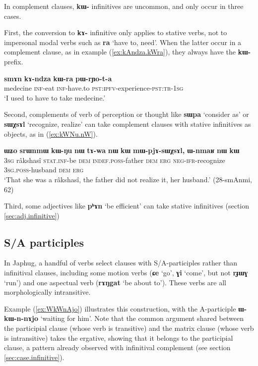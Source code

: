 \documentclass[oneside,a4paper,11pt]{article}
\newcommand{\ipa}[1]{\textbf{\phon#1}} %
\newcommand{\jpg}[2]{\ipa{#1} `#2'} %
\begin{document}
In complement clauses, \ipa{kɯ-} infinitives are uncommon, and only occur in three cases.
 
 First, the conversion to \ipa{kɤ-} infinitive only applies to stative verbs, not to  impersonal modal verbs such as \jpg{ra}{have to, need}. When the latter occur in a complement clause, as in example (\ref{ex:kAndza.kWra}), they always have the \ipa{kɯ-} prefix.

\begin{exe}
\ex \label{ex:kAndza.kWra}
\gll 
\ipa{smɤn} 	\ipa{kɤ-ndza} 	\ipa{kɯ-ra} 	\ipa{pɯ-rɲo-t-a} \\ 
medecine \textsc{inf}-eat \textsc{inf}-have.to  \textsc{pst:ipfv}-experience-\textsc{pst:tr-1sg} \\
\glt  `I used to have to take medecine.' 
\end{exe}
 
 Second, complements of verb of perception or thought like \jpg{sɯpa}{consider as} or \jpg{sɯχsɤl}{recognize, realize} can take complement clauses with stative infinitives as objects, as in (\ref{ex:kWNu.nW}).
\begin{exe}
\ex \label{ex:kWNu.nW}
\gll \ipa{ɯʑo} 	\ipa{srɯnmɯ} 	\ipa{kɯ-ŋu} 	\ipa{nɯ} 	\ipa{tɤ-wa} 	\ipa{nɯ} 	\ipa{kɯ} 	\ipa{mɯ-pjɤ-sɯχsɤl,} 	\ipa{ɯ-nmaʁ} 	\ipa{nɯ} 	\ipa{kɯ} \\
\textsc{3sg} râkshasî \textsc{stat.inf}-be \textsc{dem} \textsc{indef.poss}-father \textsc{dem} \textsc{erg} \textsc{neg-ifr}-recognize \textsc{3sg.poss}-husband \textsc{dem} \textsc{erg} \\
\glt  `That she was a râkshasî, the father did not realize it, her husband.' (28-smAnmi, 62)
\end{exe}

Third, some adjectives like \jpg{pʰɤn}{be efficient} can take stative infinitives (section \ref{sec:adj.infinitive})

 \subsection{S/A participles} \label{sec:SApart}
In Japhug, a handful of verbs select clauses with S/A-participles rather than infinitival clauses, including  some motion verbs (\jpg{ɕe}{go}, \jpg{ɣi}{come}, but not \jpg{rɟɯɣ}{run}) and one aspectual verb  (\jpg{rɤŋgat}{be about to}). These verbs are all morphologically intransitive.

Example (\ref{ex:WkWnAjo}) illustrates this construction, with the A-participle \ipa{ɯ-kɯ-n-nɤjo} `waiting for him'. Note that the common argument shared between the participial clause (whose verb is transitive) and the matrix clause (whose verb is intransitive) takes the ergative, showing that it belongs to the participial clause, a pattern already observed with infinitival complement (see section \ref{sec:case.infinitive}).
\end{document}
